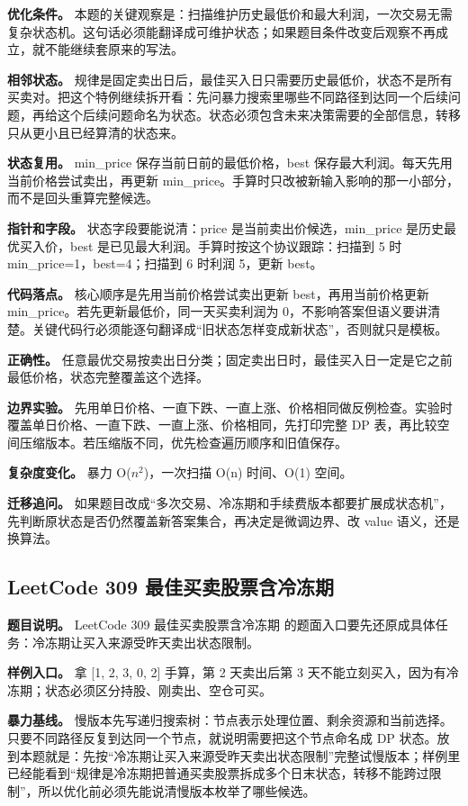 \textbf{优化条件。} 本题的关键观察是：扫描维护历史最低价和最大利润，一次交易无需复杂状态机。这句话必须能翻译成可维护状态；如果题目条件改变后观察不再成立，就不能继续套原来的写法。

\textbf{相邻状态。} 规律是固定卖出日后，最佳买入日只需要历史最低价，状态不是所有买卖对。把这个特例继续拆开看：先问暴力搜索里哪些不同路径到达同一个后续问题，再给这个后续问题命名为状态。状态必须包含未来决策需要的全部信息，转移只从更小且已经算清的状态来。

\textbf{状态复用。} min\_price 保存当前日前的最低价格，best 保存最大利润。每天先用当前价格尝试卖出，再更新 min\_price。手算时只改被新输入影响的那一小部分，而不是回头重算完整候选。

\textbf{指针和字段。} 状态字段要能说清：price 是当前卖出价候选，min\_price 是历史最优买入价，best 是已见最大利润。手算时按这个协议跟踪：扫描到 5 时 min\_price=1，best=4；扫描到 6 时利润 5，更新 best。

\textbf{代码落点。} 核心顺序是先用当前价格尝试卖出更新 best，再用当前价格更新 min\_price。若先更新最低价，同一天买卖利润为 0，不影响答案但语义要讲清楚。关键代码行必须能逐句翻译成“旧状态怎样变成新状态”，否则就只是模板。

\textbf{正确性。} 任意最优交易按卖出日分类；固定卖出日时，最佳买入日一定是它之前最低价格，状态完整覆盖这个选择。

\textbf{边界实验。} 先用单日价格、一直下跌、一直上涨、价格相同做反例检查。实验时覆盖单日价格、一直下跌、一直上涨、价格相同，先打印完整 DP 表，再比较空间压缩版本。若压缩版不同，优先检查遍历顺序和旧值保存。

\textbf{复杂度变化。} 暴力 O(\ensuremath{n^{2}})，一次扫描 O(n) 时间、O(1) 空间。

\textbf{迁移追问。} 如果题目改成“多次交易、冷冻期和手续费版本都要扩展成状态机”，先判断原状态是否仍然覆盖新答案集合，再决定是微调边界、改 value 语义，还是换算法。

\subsection{LeetCode 309 最佳买卖股票含冷冻期}

\textbf{题目说明。} LeetCode 309 最佳买卖股票含冷冻期 的题面入口要先还原成具体任务：冷冻期让买入来源受昨天卖出状态限制。

\textbf{样例入口。} 拿 [1, 2, 3, 0, 2] 手算，第 2 天卖出后第 3 天不能立刻买入，因为有冷冻期；状态必须区分持股、刚卖出、空仓可买。

\textbf{暴力基线。} 慢版本先写递归搜索树：节点表示处理位置、剩余资源和当前选择。只要不同路径反复到达同一个节点，就说明需要把这个节点命名成 DP 状态。放到本题就是：先按“冷冻期让买入来源受昨天卖出状态限制”完整试慢版本；样例里已经能看到“规律是冷冻期把普通买卖股票拆成多个日末状态，转移不能跨过限制”，所以优化前必须先能说清慢版本枚举了哪些候选。

